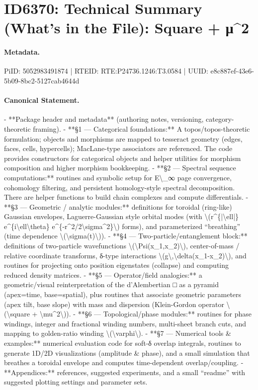 \section*{ID6370: Technical Summary (What’s in the File): Square + μ\textasciicircum{}2}
\paragraph{Metadata.}
PiID: 5052983491874 | RTEID: RTE:P24736.1246:T3.0584 | UUID: e8c887ef-43e6-5b09-8bc2-5127cab4644d

\paragraph{Canonical Statement.}
- **Package header and metadata** (authoring notes, versioning, category-theoretic framing). - **§1 — Categorical foundations:** A topos/topos-theoretic formulation; objects and morphisms are mapped to tesseract geometry (edges, faces, cells, hypercells); MacLane-type associators are referenced. The code provides constructors for categorical objects and helper utilities for morphism composition and higher morphism bookkeeping. - **§2 — Spectral sequence computations:** routines and symbolic setup for E\textbackslash{}\_∞ page convergence, cohomology filtering, and persistent homology-style spectral decomposition. There are helper functions to build chain complexes and compute differentials. - **§3 — Geometric / analytic modules:** definitions for toroidal (ring-like) Gaussian envelopes, Laguerre-Gaussian style orbital modes (with \textbackslash{}(r\textasciicircum{}\{|\textbackslash{}ell|\} e\textasciicircum{}\{i\textbackslash{}ell\textbackslash{}theta\} e\textasciicircum{}\{-r\textasciicircum{}2/2\textbackslash{}sigma\textasciicircum{}2\}\textbackslash{}) forms), and parameterized “breathing” (time dependence \textbackslash{}(\textbackslash{}sigma(t)\textbackslash{})). - **§4 — Two-particle/entanglement block:** definitions of two-particle wavefunctions \textbackslash{}(\textbackslash{}Psi(x\_1,x\_2)\textbackslash{}), center-of-mass / relative coordinate transforms, δ-type interactions \textbackslash{}(g\textbackslash{},\textbackslash{}delta(x\_1-x\_2)\textbackslash{}), and routines for projecting onto position eigenstates (collapse) and computing reduced density matrices. - **§5 — Operator/field analogies:** a geometric/visual reinterpretation of the d’Alembertian □ as a pyramid (apex=time, base=spatial), plus routines that associate geometric parameters (apex tilt, base slope) with mass and dispersion (Klein-Gordon operator \textbackslash{}(\textbackslash{}square + \textbackslash{}mu\textasciicircum{}2\textbackslash{})). - **§6 — Topological/phase modules:** routines for phase windings, integer and fractional winding numbers, multi-sheet branch cuts, and mapping to golden-ratio winding \textbackslash{}(\textbackslash{}varphi\textbackslash{}). - **§7 — Numerical tools \& examples:** numerical evaluation code for soft-δ overlap integrals, routines to generate 1D/2D visualizations (amplitude \& phase), and a small simulation that breathes a toroidal envelope and computes time-dependent overlap/coupling. - **Appendices:** references, suggested experiments, and a small “readme” with suggested plotting settings and parameter sets.


